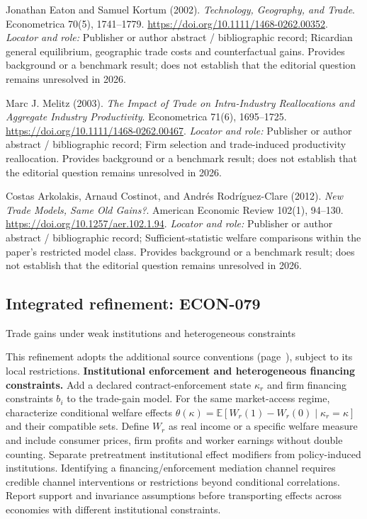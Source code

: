 \documentclass[11pt,a4paper]{article}
\begin{document}
\begin{enumerate}[label={[S\arabic*]},leftmargin=*]

\item Jonathan Eaton and Samuel Kortum (2002). \emph{Technology, Geography, and Trade}. Econometrica 70(5), 1741–1779. \url{https://doi.org/10.1111/1468-0262.00352}.
\textit{Locator and role:} Publisher or author abstract / bibliographic record; Ricardian general equilibrium, geographic trade costs and counterfactual gains. Provides background or a benchmark result; does not establish that the editorial question remains unresolved in 2026.

\item Marc J. Melitz (2003). \emph{The Impact of Trade on Intra-Industry Reallocations and Aggregate Industry Productivity}. Econometrica 71(6), 1695–1725. \url{https://doi.org/10.1111/1468-0262.00467}.
\textit{Locator and role:} Publisher or author abstract / bibliographic record; Firm selection and trade-induced productivity reallocation. Provides background or a benchmark result; does not establish that the editorial question remains unresolved in 2026.

\item Costas Arkolakis, Arnaud Costinot, and Andrés Rodríguez-Clare (2012). \emph{New Trade Models, Same Old Gains?}. American Economic Review 102(1), 94–130. \url{https://doi.org/10.1257/aer.102.1.94}.
\textit{Locator and role:} Publisher or author abstract / bibliographic record; Sufficient-statistic welfare comparisons within the paper’s restricted model class. Provides background or a benchmark result; does not establish that the editorial question remains unresolved in 2026.

\end{enumerate}

\subsection*{Integrated refinement: ECON-079}
{\sffamily\small\color{muted}Trade gains under weak institutions and heterogeneous constraints\par}
This refinement adopts the additional source conventions
(page~\pageref{audited:conventions}), subject to its local restrictions.
\textbf{Institutional enforcement and heterogeneous financing constraints.}
Add a declared contract-enforcement state $\kappa_r$ and firm financing
constraints $b_i$ to the trade-gain model. For the same market-access regime,
characterize conditional welfare effects
$\theta(\kappa)=\mathbb E[W_r(1)-W_r(0)\mid\kappa_r=\kappa]$ and their compatible
sets. Define $W_r$ as real income or a specific welfare measure and include
consumer prices, firm profits and worker earnings without double counting.
Separate pretreatment institutional effect modifiers from policy-induced
institutions. Identifying a financing/enforcement mediation channel requires
credible channel interventions or restrictions beyond conditional correlations.
Report support and invariance assumptions before transporting effects across
economies with different institutional constraints.
\end{document}

